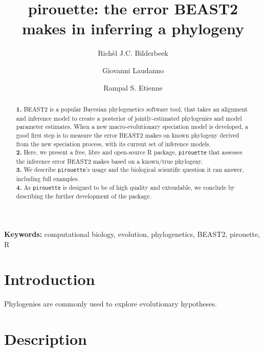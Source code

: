 \documentclass{article}
\title{pirouette: the error BEAST2 makes in inferring a phylogeny}
\author[1]{Rich\`el J.C. Bilderbeek}
\author[1]{Giovanni Laudanno}
\author[1]{Rampal S. Etienne}
\affil[1]{Groningen Institute for Evolutionary Life Sciences, University of Groningen, Groningen, The Netherlands}
\begin{document}
\maketitle

\begin{abstract}

  \textbf{1. }
    BEAST2 is a popular Bayesian phylogenetics software tool,
    that takes an alignment and inference model to create a
    posterior of jointly-estimated phylogenies and model parameter estimates.
    When a new macro-evolutionary speciation model is developed,
    a good first step is to measure the error BEAST2 makes on known
    phylogeny derived from the new speciation process, 
    with its current set of inference models. \\
  \textbf{2. }
    Here, we present a free, libre and open-source R package, \verb;pirouette;
    that assesses the inference error BEAST2 makes based on a known/true 
    phylogeny. \\
  \textbf{3. }
    We describe \verb;pirouette;'s usage and the biological scientific
    question it can answer, including full examples. \\
  \textbf{4. }
    As \verb;pirouette; is designed to be of high quality and extendable, 
    we conclude by describing the further development of the package. \\
\end{abstract}

{\bf Keywords:} computational biology, evolution, phylogenetics, BEAST2, pirouette, R





\section{Introduction}

Phylogenies are commonly used to explore evolutionary hypotheses.

\section{Description}
\end{document}
